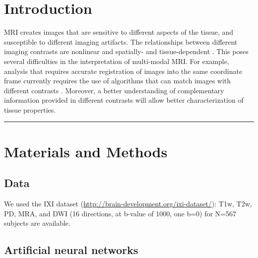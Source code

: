 \documentclass[a0, portrait]{a0poster}
\begin{document}

\begin{multicols}{2} %


\section*{Introduction}

MRI creates images that are sensitive to different aspects of the tissue,
and susceptible to different imaging artifacts. The relationships between
different imaging contrasts are nonlinear and spatially- and
tissue-dependent \cite{Vymazal1995-zo}. This poses several difficulties
in the interpretation of multi-modal MRI. For example, analysis that
requires accurate registration of images into the same coordinate frame
currently requires the use of algorithms that can match images with
different contrasts \cite{Klein2009-gq}. Moreover, a better understanding
of complementary information provided in different contrasts will allow
better characterization of tissue properties.

\rule{\linewidth}{0.4pt}

\normalsize
\section*{Materials and Methods}

\subsection*{Data}
We used the IXI dataset (\url{http://brain-development.org/ixi-dataset/}): T1w, T2w, PD, MRA, and DWI (16 directions, at b-value of 1000, one b=0) for N=567 subjects are available.

\subsection*{Artificial neural networks}


\end{multicols}
\end{document}
